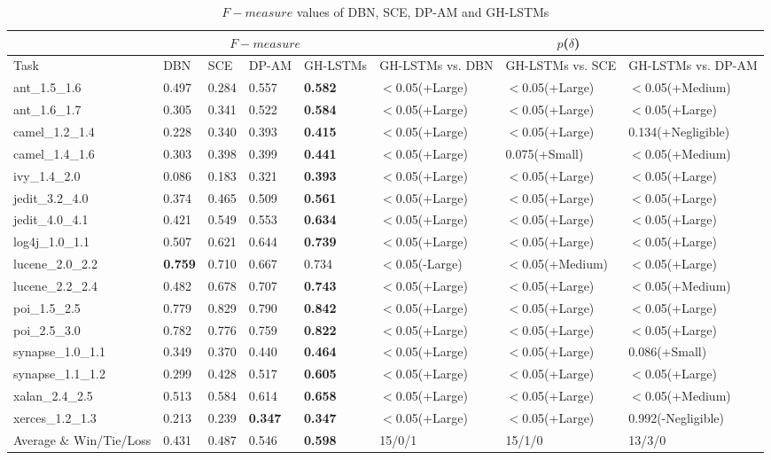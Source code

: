 \documentclass[journal]{IEEEtran}
\begin{document}
\begin{table}[htbp]
	\scriptsize
	\caption{$F-measure$ values of DBN, SCE, DP-AM and GH-LSTMs}
	\label{tab_f}
	\tabcolsep 9pt
	\centering
	\begin{tabular}{m{2cm}|llll|lll}
		\toprule
		&\multicolumn{4}{c|}{$F-measure$}  &\multicolumn{3}{c}{$p$($\delta$)}   \\
		\midrule
		Task  &DBN  &SCE  &DP-AM  &GH-LSTMs  &GH-LSTMs vs. DBN  &GH-LSTMs vs. SCE  &GH-LSTMs vs. DP-AM   \\\midrule
		ant\_1.5\_1.6     &0.497     &0.284     &0.557     &\textbf{0.582}&$<$0.05(+Large)&$<$0.05(+Large)&$<$0.05(+Medium)\\
		ant\_1.6\_1.7     &0.305     &0.341     &0.522     &\textbf{0.584}&$<$0.05(+Large)&$<$0.05(+Large)&$<$0.05(+Large)\\
		camel\_1.2\_1.4   &0.228     &0.340     &0.393     &\textbf{0.415}&$<$0.05(+Large)&$<$0.05(+Large)&0.134(+Negligible)\\
		camel\_1.4\_1.6   &0.303     &0.398     &0.399     &\textbf{0.441}&$<$0.05(+Large)&0.075(+Small)&$<$0.05(+Medium)\\
		ivy\_1.4\_2.0     &0.086     &0.183     &0.321     &\textbf{0.393}&$<$0.05(+Large)&$<$0.05(+Large)&$<$0.05(+Large)\\
		jedit\_3.2\_4.0   &0.374     &0.465     &0.509     &\textbf{0.561}&$<$0.05(+Large)&$<$0.05(+Large)&$<$0.05(+Large)\\
		jedit\_4.0\_4.1   &0.421     &0.549     &0.553     &\textbf{0.634}&$<$0.05(+Large)&$<$0.05(+Large)&$<$0.05(+Large)\\
		log4j\_1.0\_1.1   &0.507     &0.621     &0.644     &\textbf{0.739}&$<$0.05(+Large)&$<$0.05(+Large)&$<$0.05(+Large)\\
		lucene\_2.0\_2.2  &\textbf{0.759}&0.710     &0.667     &0.734     &$<$0.05(-Large)&$<$0.05(+Medium)&$<$0.05(+Large)\\
		lucene\_2.2\_2.4  &0.482     &0.678     &0.707     &\textbf{0.743}&$<$0.05(+Large)&$<$0.05(+Large)&$<$0.05(+Medium)\\
		poi\_1.5\_2.5     &0.779     &0.829     &0.790     &\textbf{0.842}&$<$0.05(+Large)&$<$0.05(+Large)&$<$0.05(+Large)\\
		poi\_2.5\_3.0     &0.782     &0.776     &0.759     &\textbf{0.822}&$<$0.05(+Large)&$<$0.05(+Large)&$<$0.05(+Large)\\
		synapse\_1.0\_1.1 &0.349     &0.370     &0.440     &\textbf{0.464}&$<$0.05(+Large)&$<$0.05(+Large)&0.086(+Small)\\
		synapse\_1.1\_1.2 &0.299     &0.428     &0.517     &\textbf{0.605}&$<$0.05(+Large)&$<$0.05(+Large)&$<$0.05(+Large)\\
		xalan\_2.4\_2.5   &0.513     &0.584     &0.614     &\textbf{0.658}&$<$0.05(+Large)&$<$0.05(+Large)&$<$0.05(+Medium)\\
		xerces\_1.2\_1.3  &0.213     &0.239     &\textbf{0.347}&\textbf{0.347}&$<$0.05(+Large)&$<$0.05(+Large)&0.992(-Negligible)\\\midrule
		Average $\&$ Win/Tie/Loss&0.431&0.487&0.546&\textbf{0.598}&15/0/1&15/1/0&13/3/0\\
		\bottomrule
	\end{tabular}
\end{table}
\end{document}
